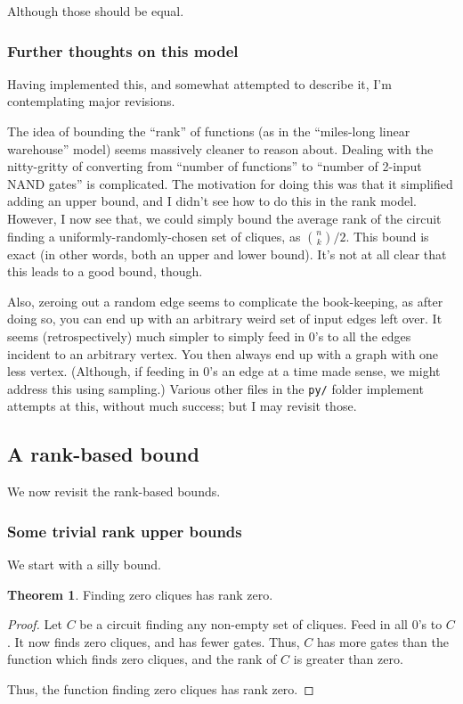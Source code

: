 \documentclass[12pt]{article}
\theoremstyle{definition}
\newtheorem{thm}{Theorem}[section]
\begin{document}
Although those should be equal.

\subsubsection{Further thoughts on this model}

Having implemented this, and somewhat attempted to describe it,
I'm contemplating major revisions.

The idea of bounding the ``rank'' of functions (as in the
``miles-long linear warehouse'' model) seems massively cleaner to reason about.
Dealing with the nitty-gritty of converting from ``number of functions''
to ``number of 2-input NAND gates'' is complicated. The motivation
for doing this was that it simplified adding an upper bound, and I
didn't see how to do this in the rank model.
However, I now see that, we could simply bound the
average rank of the circuit finding a uniformly-randomly-chosen set of cliques, as
${n \choose k}/2$. This bound is exact (in other words, both an
upper and lower bound). It's not at all clear that this leads to a good bound, though.

Also, zeroing out a random edge seems to complicate the book-keeping,
as after doing so, you can end up with an arbitrary weird set of
input edges left over. It seems (retrospectively) much simpler to
simply feed in 0's to all the edges incident to an arbitrary vertex.
You then always end up with a graph with one less vertex.
(Although, if feeding in 0's an edge at a time made sense, we might
address this using sampling.)
Various other files in the {\tt py/} folder implement attempts at
this, without much success; but I may revisit those.


\subsection{A rank-based bound}

We now revisit the rank-based bounds.

\subsubsection{Some trivial rank upper bounds}

We start with a silly bound.

\begin{thm}
\label{zeroCliques}
Finding zero cliques has rank zero.
\end{thm}
\begin{proof}

Let $C$ be a circuit finding any non-empty set of cliques.
Feed in all 0's to $C$. It now finds zero cliques, and has
fewer gates. Thus, $C$ has more gates than the function
which finds zero cliques, and the rank of $C$ is greater
than zero.

Thus, the function finding zero cliques has rank zero.

\end{proof}
 
\end{document}
